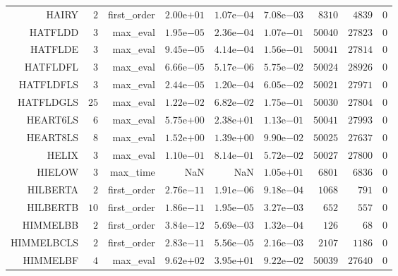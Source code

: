 \begin{longtable}{rrrrrrrrr}
HAIRY & \(     2\) & first\_order & \( 2.00\)e\(+01\) & \( 1.07\)e\(-04\) & \( 7.08\)e\(-03\) & \(  8310\) & \(  4839\) & \(     0\) \\
HATFLDD & \(     3\) & max\_eval & \( 1.95\)e\(-05\) & \( 2.36\)e\(-04\) & \( 1.07\)e\(-01\) & \( 50040\) & \( 27823\) & \(     0\) \\
HATFLDE & \(     3\) & max\_eval & \( 9.45\)e\(-05\) & \( 4.14\)e\(-04\) & \( 1.56\)e\(-01\) & \( 50041\) & \( 27814\) & \(     0\) \\
HATFLDFL & \(     3\) & max\_eval & \( 6.66\)e\(-05\) & \( 5.17\)e\(-06\) & \( 5.75\)e\(-02\) & \( 50024\) & \( 28926\) & \(     0\) \\
HATFLDFLS & \(     3\) & max\_eval & \( 2.44\)e\(-05\) & \( 1.20\)e\(-04\) & \( 6.05\)e\(-02\) & \( 50021\) & \( 27971\) & \(     0\) \\
HATFLDGLS & \(    25\) & max\_eval & \( 1.22\)e\(-02\) & \( 6.82\)e\(-02\) & \( 1.75\)e\(-01\) & \( 50030\) & \( 27804\) & \(     0\) \\
HEART6LS & \(     6\) & max\_eval & \( 5.75\)e\(+00\) & \( 2.38\)e\(+01\) & \( 1.13\)e\(-01\) & \( 50041\) & \( 27993\) & \(     0\) \\
HEART8LS & \(     8\) & max\_eval & \( 1.52\)e\(+00\) & \( 1.39\)e\(+00\) & \( 9.90\)e\(-02\) & \( 50025\) & \( 27637\) & \(     0\) \\
HELIX & \(     3\) & max\_eval & \( 1.10\)e\(-01\) & \( 8.14\)e\(-01\) & \( 5.72\)e\(-02\) & \( 50027\) & \( 27800\) & \(     0\) \\
HIELOW & \(     3\) & max\_time &       NaN &       NaN & \( 1.05\)e\(+01\) & \(  6801\) & \(  6836\) & \(     0\) \\
HILBERTA & \(     2\) & first\_order & \( 2.76\)e\(-11\) & \( 1.91\)e\(-06\) & \( 9.18\)e\(-04\) & \(  1068\) & \(   791\) & \(     0\) \\
HILBERTB & \(    10\) & first\_order & \( 1.86\)e\(-11\) & \( 1.95\)e\(-05\) & \( 3.27\)e\(-03\) & \(   652\) & \(   557\) & \(     0\) \\
HIMMELBB & \(     2\) & first\_order & \( 3.84\)e\(-12\) & \( 5.69\)e\(-03\) & \( 1.32\)e\(-04\) & \(   126\) & \(    68\) & \(     0\) \\
HIMMELBCLS & \(     2\) & first\_order & \( 2.83\)e\(-11\) & \( 5.56\)e\(-05\) & \( 2.16\)e\(-03\) & \(  2107\) & \(  1186\) & \(     0\) \\
HIMMELBF & \(     4\) & max\_eval & \( 9.62\)e\(+02\) & \( 3.95\)e\(+01\) & \( 9.22\)e\(-02\) & \( 50039\) & \( 27640\) & \(     0\) \\

\end{longtable}
